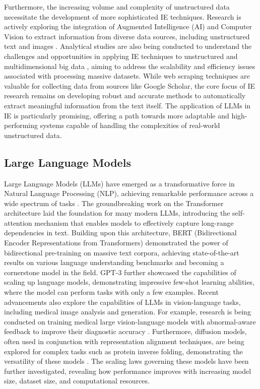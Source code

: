 Furthermore, the increasing volume and complexity of unstructured data necessitate the development of more sophisticated IE techniques. Research is actively exploring the integration of Augmented Intelligence (AI) and Computer Vision to extract information from diverse data sources, including unstructured text and images \cite{CITE-IE-AUGMENTED-AI}. Analytical studies are also being conducted to understand the challenges and opportunities in applying IE techniques to unstructured and multidimensional big data \cite{CITE-IE-RESEARCHGATE}, aiming to address the scalability and efficiency issues associated with processing massive datasets. While web scraping techniques are valuable for collecting data from sources like Google Scholar, the core focus of IE research remains on developing robust and accurate methods to automatically extract meaningful information from the text itself. The application of LLMs in IE is particularly promising, offering a path towards more adaptable and high-performing systems capable of handling the complexities of real-world unstructured data.

\subsection{Large Language Models}

Large Language Models (LLMs) have emerged as a transformative force in Natural Language Processing (NLP), achieving remarkable performance across a wide spectrum of tasks \cite{Vaswani2017}. The groundbreaking work on the Transformer architecture \cite{Vaswani2017} laid the foundation for many modern LLMs, introducing the self-attention mechanism that enables models to effectively capture long-range dependencies in text. Building upon this architecture, BERT (Bidirectional Encoder Representations from Transformers) demonstrated the power of bidirectional pre-training on massive text corpora, achieving state-of-the-art results on various language understanding benchmarks and becoming a cornerstone model in the field. GPT-3 further showcased the capabilities of scaling up language models, demonstrating impressive few-shot learning abilities, where the model can perform tasks with only a few examples.  Recent advancements also explore the capabilities of LLMs in vision-language tasks, including medical image analysis and generation. For example, research is being conducted on training medical large vision-language models with abnormal-aware feedback to improve their diagnostic accuracy \cite{zhou2025training}.  Furthermore, diffusion models, often used in conjunction with representation alignment techniques, are being explored for complex tasks such as protein inverse folding, demonstrating the versatility of these models \cite{wang2024diffusion}. The scaling laws governing these models have been further investigated, revealing how performance improves with increasing model size, dataset size, and computational resources.

